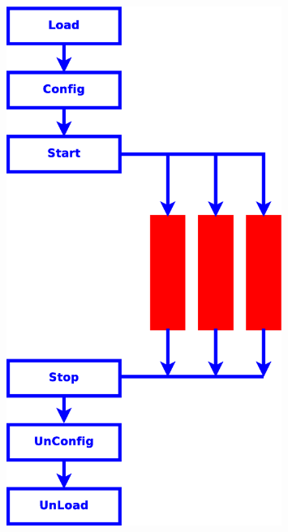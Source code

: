 \documentclass[10pt]{beamer}
\begin{document}
{\begin{columns}
    \begin{column}{0.3\textwidth}
      \begin{figure}
        \begin{center}
          \includegraphics[angle=0,width=0.8\textwidth]{figs/tdaq-mt-flow.eps}
        \end{center}
      \end{figure}
    \end{column}
  \end{columns}
}
\end{document}
